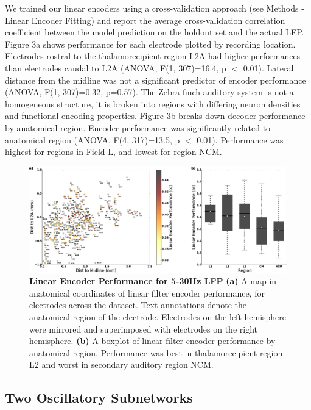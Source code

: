     We trained our linear encoders using a cross-validation approach (see Methods - Linear Encoder Fitting) and report the average cross-validation correlation coefficient between the model prediction on the holdout set and the actual LFP. Figure 3a shows performance for each electrode plotted by recording location. Electrodes rostral to the thalamorecipient region L2A had higher performances than electrodes caudal to L2A (ANOVA, F(1, 307)=16.4, p $<$ 0.01). Lateral distance from the midline was not a significant predictor of encoder performance (ANOVA, F(1, 307)=0.32, p=0.57). The Zebra finch auditory system is not a homogeneous structure, it is broken into regions with differing neuron densities and functional encoding properties. Figure 3b breaks down decoder performance by anatomical region. Encoder performance was significantly related to anatomical region (ANOVA, F(4, 317)=13.5, p $<$ 0.01). Performance was highest for regions in Field L, and lowest for region NCM.

\begin{figure}
    \caption{\textbf{Linear Encoder Performance for 5-30Hz LFP} \textbf{(a)} A map in anatomical coordinates of linear filter encoder performance, for electrodes across the dataset. Text annotations denote the anatomical region of the electrode. Electrodes on the left hemisphere were mirrored and superimposed with electrodes on the right hemisphere. \textbf{(b)} A boxplot of linear filter encoder performance by anatomical region. Performance was best in thalamorecipient region L2 and worst in secondary auditory region NCM.
}
    \centering
    \includegraphics[scale=0.25]{figure_2_3.eps}
\end{figure}

\subsection{Two Oscillatory Subnetworks}

